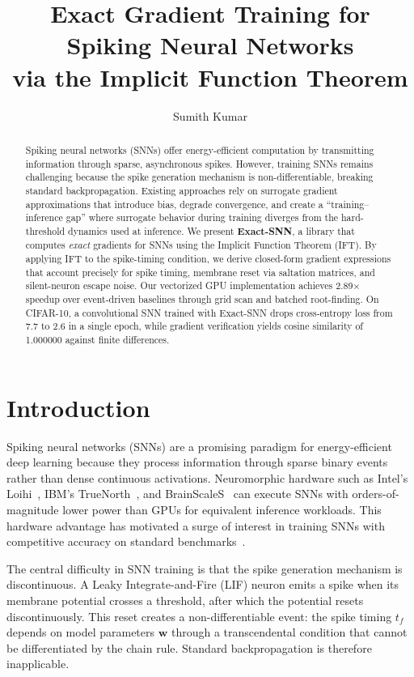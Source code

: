 \documentclass[10pt,twocolumn]{article}
\title{Exact Gradient Training for Spiking Neural Networks\\via the Implicit Function Theorem}
\author{Sumith Kumar}
\begin{document}
\maketitle

\begin{abstract}
Spiking neural networks (SNNs) offer energy-efficient computation by transmitting information through sparse, asynchronous spikes. However, training SNNs remains challenging because the spike generation mechanism is non-differentiable, breaking standard backpropagation. Existing approaches rely on surrogate gradient approximations that introduce bias, degrade convergence, and create a ``training--inference gap'' where surrogate behavior during training diverges from the hard-threshold dynamics used at inference. We present \textbf{Exact-SNN}, a library that computes \emph{exact} gradients for SNNs using the Implicit Function Theorem (IFT). By applying IFT to the spike-timing condition, we derive closed-form gradient expressions that account precisely for spike timing, membrane reset via saltation matrices, and silent-neuron escape noise. Our vectorized GPU implementation achieves 2.89$\times$ speedup over event-driven baselines through grid scan and batched root-finding. On CIFAR-10, a convolutional SNN trained with Exact-SNN drops cross-entropy loss from 7.7 to 2.6 in a single epoch, while gradient verification yields cosine similarity of 1.000000 against finite differences.
\end{abstract}

\section{Introduction}

Spiking neural networks (SNNs) are a promising paradigm for energy-efficient deep learning because they process information through sparse binary events rather than dense continuous activations. Neuromorphic hardware such as Intel's Loihi~\citep{davies2018loihi}, IBM's TrueNorth~\citep{akopyan2015truenorth}, and BrainScaleS~\citep{penschuck2020brainscales} can execute SNNs with orders-of-magnitude lower power than GPUs for equivalent inference workloads. This hardware advantage has motivated a surge of interest in training SNNs with competitive accuracy on standard benchmarks~\citep{spikingjelly2021, wunderlich2021eventprop, lee2023forwardprop}.

The central difficulty in SNN training is that the spike generation mechanism is discontinuous. A Leaky Integrate-and-Fire (LIF) neuron emits a spike when its membrane potential crosses a threshold, after which the potential resets discontinuously. This reset creates a non-differentiable event: the spike timing $t_f$ depends on model parameters $\mathbf{w}$ through a transcendental condition that cannot be differentiated by the chain rule. Standard backpropagation is therefore inapplicable.
\end{document}

